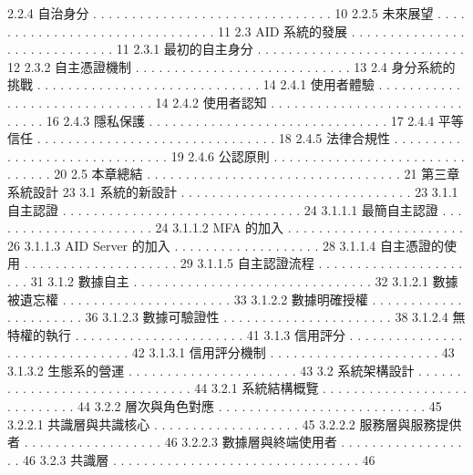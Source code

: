 2.2.4 自治身分 . . . . . . . . . . . . . . . . . . . . . . . . . . . . . . . 10
2.2.5 未來展望 . . . . . . . . . . . . . . . . . . . . . . . . . . . . . . . 11
2.3 AID 系統的發展 . . . . . . . . . . . . . . . . . . . . . . . . . . . . . 11
2.3.1 最初的自主身分 . . . . . . . . . . . . . . . . . . . . . . . . . . . 12
2.3.2 自主憑證機制 . . . . . . . . . . . . . . . . . . . . . . . . . . . . 13
2.4 身分系統的挑戰 . . . . . . . . . . . . . . . . . . . . . . . . . . . . . 14
2.4.1 使用者體驗 . . . . . . . . . . . . . . . . . . . . . . . . . . . . . . 14
2.4.2 使用者認知 . . . . . . . . . . . . . . . . . . . . . . . . . . . . . . 16
2.4.3 隱私保護 . . . . . . . . . . . . . . . . . . . . . . . . . . . . . . . 17
2.4.4 平等信任 . . . . . . . . . . . . . . . . . . . . . . . . . . . . . . . 18
2.4.5 法律合規性 . . . . . . . . . . . . . . . . . . . . . . . . . . . . . . 19
2.4.6 公認原則 . . . . . . . . . . . . . . . . . . . . . . . . . . . . . . . 20
2.5 本章總結 . . . . . . . . . . . . . . . . . . . . . . . . . . . . . . . . . 21
第三章 系統設計 23
3.1 系統的新設計 . . . . . . . . . . . . . . . . . . . . . . . . . . . . . . 23
3.1.1 自主認證 . . . . . . . . . . . . . . . . . . . . . . . . . . . . . . . 24
3.1.1.1 最簡自主認證 . . . . . . . . . . . . . . . . . . . . . . 24
3.1.1.2 MFA 的加入 . . . . . . . . . . . . . . . . . . . . . . . 26
3.1.1.3 AID Server 的加入 . . . . . . . . . . . . . . . . . . . 28
3.1.1.4 自主憑證的使用 . . . . . . . . . . . . . . . . . . . . 29
3.1.1.5 自主認證流程 . . . . . . . . . . . . . . . . . . . . . . 31
3.1.2 數據自主 . . . . . . . . . . . . . . . . . . . . . . . . . . . . . . . 32
3.1.2.1 數據被遺忘權 . . . . . . . . . . . . . . . . . . . . . . 33
3.1.2.2 數據明確授權 . . . . . . . . . . . . . . . . . . . . . . 36
3.1.2.3 數據可驗證性 . . . . . . . . . . . . . . . . . . . . . . 38
3.1.2.4 無特權的執行 . . . . . . . . . . . . . . . . . . . . . . 41
3.1.3 信用評分 . . . . . . . . . . . . . . . . . . . . . . . . . . . . . . . 42
3.1.3.1 信用評分機制 . . . . . . . . . . . . . . . . . . . . . . 43
3.1.3.2 生態系的營運 . . . . . . . . . . . . . . . . . . . . . . 43
3.2 系統架構設計 . . . . . . . . . . . . . . . . . . . . . . . . . . . . . . 44
3.2.1 系統結構概覽 . . . . . . . . . . . . . . . . . . . . . . . . . . . . 44
3.2.2 層次與角色對應 . . . . . . . . . . . . . . . . . . . . . . . . . . . 45
3.2.2.1 共識層與共識核心 . . . . . . . . . . . . . . . . . . . 45
3.2.2.2 服務層與服務提供者 . . . . . . . . . . . . . . . . . . 46
3.2.2.3 數據層與終端使用者 . . . . . . . . . . . . . . . . . . 46
3.2.3 共識層 . . . . . . . . . . . . . . . . . . . . . . . . . . . . . . . . 46
